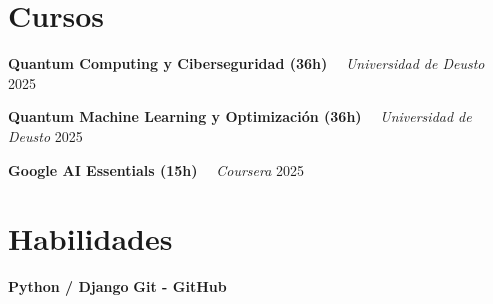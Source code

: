 \documentclass[letterpaper,11pt]{article}
\begin{document}
\section{Cursos}
    \noindent
    \begin{minipage}[t]{1.0\linewidth}
        {\textbf{Quantum Computing y Ciberseguridad (36h)}} 
        \ \textendash \ 
        {\color{detailgray}\textit{Universidad de Deusto}}
        \hfill 
        {\small 2025}
    \end{minipage}
    \par 
    \vspace{0.1cm} 
    \noindent
    \begin{minipage}[t]{1.0\linewidth}
        {\textbf{Quantum Machine Learning y Optimización (36h)}} 
        \ \textendash \ 
        {\color{detailgray}\textit{Universidad de Deusto}}
        \hfill 
        {\small 2025}
    \end{minipage}
    \par 
    \vspace{0.1cm} 
    \noindent
    \begin{minipage}[t]{1.0\linewidth}
        {\textbf{Google AI Essentials (15h)}} 
        \ \textendash \ 
        {\color{detailgray}\textit{Coursera}}
        \hfill 
        {\small 2025}
    \end{minipage}
    \par 
    \vspace{0.1cm} 

\section{Habilidades}
\noindent
    \textbf{Python / Django} 
     \quad \textbullet \quad     \textbf{Git - GitHub} 
    
\end{document}
